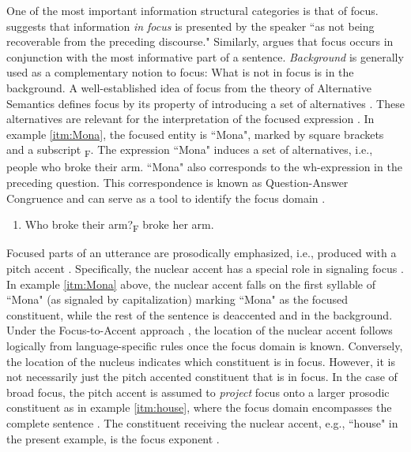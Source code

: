 One of the most important information structural categories is that of focus. \citet[204]{hallidayNotesTransitivityTheme1967} suggests that information \textit{in focus} is presented by the speaker ``as not being recoverable from the preceding discourse." Similarly, \citet[448]{buringSemanticsIntonationInformation2007} argues that focus occurs in conjunction with the most informative part of a sentence. \textit{Background} is generally used as a complementary notion to focus: What is not in focus is in the background. A well-established idea of focus from the theory of Alternative Semantics defines focus by its property of introducing a set of alternatives \citep{roothTheoryFocusInterpretation1992}. These alternatives are relevant for the interpretation of the focused expression \citep[see also][]{krifkaBasicNotionsInformation2008}. In example \ref{itm:Mona}, the focused entity is ``Mona", marked by square brackets and a subscript \textsubscript{F}. The expression ``Mona" induces a set of alternatives, i.e., people who broke their arm. ``Mona" also corresponds to the wh-expression in the preceding question. This correspondence is known as Question-Answer Congruence and can serve as a tool to identify the focus domain \citep[e.g.,][]{buringSemanticsIntonationInformation2007}. 

\begin{enumerate}[label=(\arabic*)]
\item \label{itm:Mona} Who broke their arm?\newline[MOna]\textsubscript{F} broke her arm.
\end{enumerate}

Focused parts of an utterance are prosodically emphasized, i.e., produced with a pitch accent \citep[e.g.,][]{hallidayNotesTransitivityTheme1967, cutlerSemanticFocusSentence1979}. Specifically, the nuclear accent has a special role in signaling focus \citep[257, 259]{laddIntonationalPhonology2008}. In example \ref{itm:Mona} above, the nuclear accent falls on the first syllable of ``Mona" (as signaled by capitalization) marking ``Mona" as the focused constituent, while the rest of the sentence is deaccented and in the background. Under the Focus-to-Accent approach \citep[e.g.,][]{hallidayNotesTransitivityTheme1967, gussenhovenFocusModeNucleus1983, selkirkPhonologySyntaxRelation1984}, the location of the nuclear accent follows logically from language-specific rules once the focus domain is known. Conversely, the location of the nucleus indicates which constituent is in focus. However, it is not necessarily just the pitch accented constituent that is in focus. In the case of broad focus, the pitch accent is assumed to \textit{project} focus onto a larger prosodic constituent as in example \ref{itm:house}, where the focus domain encompasses the complete sentence \citep{selkirkPhonologySyntaxRelation1984, selkirkSentenceProsodyIntonation1995}. The constituent receiving the nuclear accent, e.g., ``house" in the present example, is the focus exponent \citep{laddIntonationalPhonology2008}.

